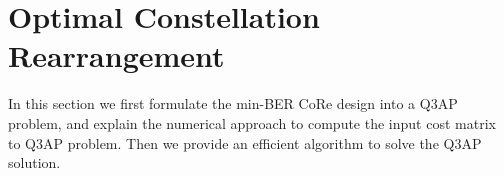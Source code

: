 \documentclass[conference]{IEEEtran}
\begin{document}

\section{Optimal Constellation Rearrangement}
\label{sec:core}
In this section we first formulate the min-BER CoRe design into a Q3AP problem,
and explain the numerical approach to compute the input cost matrix to Q3AP
problem. Then we provide an efficient algorithm to solve the Q3AP solution.
\end{document}
